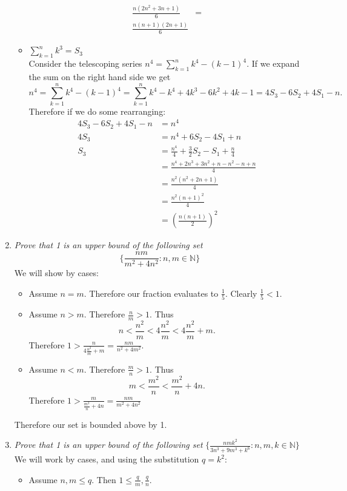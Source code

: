 \documentclass[12pt, letterpaper]{article}
\newcommand{\N}{\mathbb{N}}
\begin{document}
\begin{enumerate}
\begin{itemize}
\begin{align*}
			\frac{n(2n^2 + 3n + 1)}{6}&=\\
			\frac{n(n+1)(2n+1)}{6}
		\end{align*}
		\item $\sum_{k=1}^n k^3 = S_3$\\
		Consider the telescoping series $n^4 = \sum_{k=1}^n k^4-(k-1)^4$. 
		If we expand the sum on the right hand side we get\\
		$$n^4 = \sum_{k=1}^n k^4 - (k-1)^4 = \sum_{k=1}^n k^4-k^4 + 4k^3-6k^2 + 4k - 1 = 4S_3 - 6S_2 + 4S_1 - n.$$
		Therefore if we do some rearranging:
		\begin{align*}
			4S_3 - 6S_2 + 4S_1 - n &= n^4\\
			4S_3 &= n^4 + 6S_2 - 4S_1 + n\\
			S_3 &= \frac{n^4}{4} + \frac{3}{2}S_2 - S_1 + \frac{n}{4}\\
			&= \frac{n^4 + 2n^3 + 3n^2 + n - n^2 - n + n}{4}\\
			&= \frac{n^2(n^2+2n+1)}{4}\\
			&= \frac{n^2(n+1)^2}{4}\\
			&= \left(\frac{n(n+1)}{2}\right)^2
		\end{align*}
	\end{itemize}
	\item \textit{Prove that 1 is an upper bound of the following set}
	$$
	\{\frac{nm}{m^2 + 4n^2} : n,m \in \N\}
	$$
	We will show by cases:
	\begin{itemize}
		\item Assume $n = m$.  Therefore our fraction evaluates to $\frac{1}{5}$.
		Clearly $\frac{1}{5} < 1$.  
		\item Assume $n > m$.  Therefore $\frac{n}{m}> 1$.  Thus 
		$$
		n < \frac{n^2}{m} < 4\frac{n^2}{m} < 4\frac{n^2}{m} + m.
		$$
		Therefore $1 > \frac{n}{4\frac{n^2}{m}  + m} = \frac{nm}{n^2 + 4m^2}$.
		\item Assume $n < m$.  Therefore $\frac{m}{n}> 1$.  Thus 
		$$
		m < \frac{m^2}{n} < \frac{m^2}{n} + 4n.
		$$
		Therefore $1 > \frac{m}{\frac{m^2}{n} + 4n} = \frac{nm}{m^2 + 4n^2}$
	\end{itemize}
	Therefore our set is bounded above by 1.
	\item \textit{Prove that 1 is an upper bound of the following set}
	$
	\{\frac{nmk^2}{3n^3 + 9m^3 + k^6} : n,m,k \in \N \}
	$\\
	We will work by cases, and using the substitution $q = k^2$:
	\begin{itemize}
		\item Assume $n,m \leq q$.  Then $1 \leq \frac{q}{m},\frac{q}{n}$.

\end{itemize}
\end{enumerate}
\end{document}
